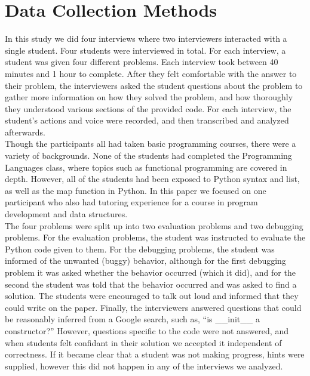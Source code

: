 \section{Data Collection Methods}


In this study we did four interviews where two interviewers interacted with a single student. Four students were interviewed in total.
For each interview, a student was given four different problems. Each interview took between 40 minutes and 1 hour to complete.
After they felt comfortable with the answer to their problem,
 the interviewers asked the student questions about the problem to gather more information on how they solved the problem,
 and how thoroughly they understood various sections of the provided code.
For each interview, the student's actions and voice were recorded, and then transcribed and analyzed afterwards. \\

Though the participants all had taken basic programming courses, there were a variety of backgrounds.
None of the students had completed the Programming Languages class, where topics such as functional programming are covered in depth.
However, all of the students had been exposed to Python syntax and list, as well as the map function in Python.
In this paper we focused on one participant who also had tutoring experience for a course in program development and data structures. \\

The four problems were split up into two evaluation problems and two debugging problems.
For the evaluation problems, the student was instructed to evaluate the Python code given to them.
For the debugging problems, the student was informed of the unwanted (buggy) behavior,
 although for the first debugging problem it was asked whether the behavior occurred (which it did),
 and for the second the student was told that the behavior occurred and was asked to find a solution.
The students were encouraged to talk out loud and informed that they could write on the paper.
Finally, the interviewers answered questions that could be reasonably inferred from a Google search, such as,
``is \_\_init\_\_ a constructor?''
However, questions specific to the code were not answered, and when students felt confidant in their solution we accepted it independent of correctness.
If it became clear that a student was not making progress, hints were supplied, however this did not happen in any of the interviews we analyzed.

\newpage